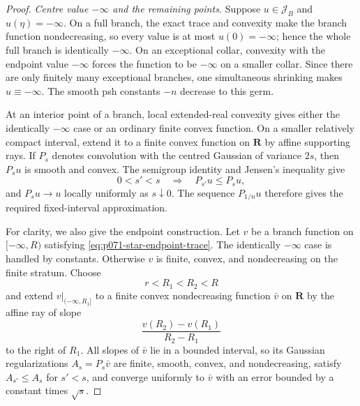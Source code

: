 \begin{proof}
\medskip\noindent
\emph{Centre value \(-\infty\) and the remaining points.}
Suppose \(u\in\mathscr J_B\) and \(u(\eta)=-\infty\).  On a full branch,
the exact trace and convexity make the branch function nondecreasing, so
every value is at most \(u(0)=-\infty\); hence the whole full branch is
identically \(-\infty\).  On an exceptional collar, convexity with the
endpoint value \(-\infty\) forces the function to be \(-\infty\) on a
smaller collar.  Since there are only finitely many exceptional branches,
one simultaneous shrinking makes \(u\equiv-\infty\).  The smooth psh
constants \(-n\) decrease to this germ.

At an interior point of a branch, local extended-real convexity gives
either the identically \(-\infty\) case or an ordinary finite convex
function.  On a smaller relatively compact interval, extend it to a
finite convex function on \(\mathbf R\) by affine supporting rays.  If
\(P_s\) denotes convolution with the centred Gaussian of variance
\(2s\), then \(P_su\) is smooth and convex.  The semigroup identity and
Jensen's inequality give
\[
               0<s'<s\quad\Longrightarrow\quad P_{s'}u\leq P_su,
\]
and \(P_su\to u\) locally uniformly as \(s\downarrow0\).  The sequence
\(P_{1/n}u\) therefore gives the required fixed-interval approximation.

For clarity, we also give the endpoint construction.  Let \(v\) be a
branch function on \([-\infty,R)\) satisfying
\eqref{eq:p071-star-endpoint-trace}.  The identically \(-\infty\) case
is handled by constants.  Otherwise \(v\) is finite, convex, and
nondecreasing on the finite stratum.  Choose
\[
                         r<R_1<R_2<R
\]
and extend \(v|_{(-\infty,R_1]}\) to a finite convex nondecreasing
function \(\bar v\) on \(\mathbf R\) by the affine ray of slope
\[
                  \frac{v(R_2)-v(R_1)}{R_2-R_1}
\]
to the right of \(R_1\).  All slopes of \(\bar v\) lie in a bounded
interval, so its Gaussian regularizations
\(A_s=P_s\bar v\) are finite, smooth, convex, and nondecreasing, satisfy
\(A_{s'}\leq A_s\) for \(s'<s\), and converge uniformly to \(\bar v\)
with an error bounded by a constant times \(\sqrt{s}\).


\end{proof}
